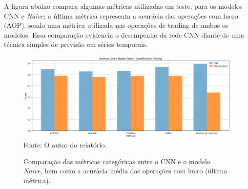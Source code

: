 \par
A figura abaixo compara algumas métricas utilizadas em teste, para os modelos CNN e \textit{Naive}; a última métrica representa a acurácia das operações com lucro (AOP), sendo uma métrica utilizada nas operações de trading de ambos os modelos. Essa comparação evidencia o desempenho da rede CNN diante de uma técnica simples de previsão em séries temporais.


\begin{figure}[hbt]
\centering
\caption{\label{figure:figura1}Comparação das métricas categóricas entre o CNN e o modelo \textit{Naive}, bem como a acurácia média das operações com lucro (última métrica).}
  \includegraphics[scale=0.43]{figures/img15.png}
  Fonte: O autor do relatório.
\end{figure}